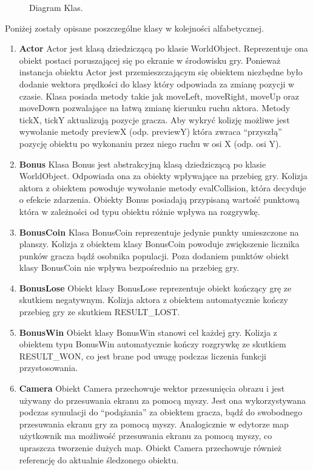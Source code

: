 \begin{par}
\begin{figure}[!h]
	\caption{Diagram Klas.}
	\label{fig:diagram_klas}
	\end{figure}
	Poniżej zostały opisane poszczególne klasy w kolejności alfabetycznej.
	\begin{enumerate}
	\item{\bf Actor }\newline
	Actor jest klasą dziedziczącą po klasie WorldObject. Reprezentuje ona obiekt postaci poruszającej się po ekranie w środowisku gry. Ponieważ instancja obiektu Actor jest przemieszczającym się obiektem niezbędne było dodanie wektora prędkości do klasy który odpowiada za zmianę pozycji w czasie. Klasa posiada metody takie jak moveLeft, moveRight, moveUp oraz moveDown pozwalające na łatwą zmianę kierunku ruchu aktora. Metody tickX, tickY aktualizują pozycje gracza. Aby wykryć kolizję możliwe jest wywołanie metody previewX (odp. previewY) która zwraca ``przyszłą'' pozycję obiektu po wykonaniu przez niego ruchu w osi X (odp. osi Y).
	\item{\bf Bonus }\newline
	Klasa Bonus jest abstrakcyjną klasą dziedziczącą po klasie WorldObject. Odpowiada ona za obiekty wpływające na przebieg gry. Kolizja aktora z obiektem powoduje wywołanie metody evalCollision, która decyduje o efekcie zdarzenia. Obiekty Bonus posiadają przypisaną wartość punktową która w zależności od typu obiektu różnie wpływa na rozgrywkę.
	\item{\bf BonusCoin }\newline
	Klasa BonusCoin reprezentuje jedynie punkty umieszczone na planszy. Kolizja z obiektem klasy BonusCoin powoduje zwiększenie licznika punków gracza bądź osobnika populacji. Poza dodaniem punktów obiekt klasy BonusCoin nie wpływa bezpośrednio na przebieg gry.
	\item{\bf BonusLose }\newline
	Obiekt klasy BonusLose reprezentuje obiekt kończący grę ze skutkiem negatywnym. Kolizja aktora z obiektem automatycznie kończy przebieg gry ze skutkiem RESULT\_LOST.
	\item{\bf BonusWin }\newline
	Obiekt klasy BonusWin stanowi cel każdej gry. Kolizja z obiektem typu BonusWin automatycznie kończy rozgrywkę ze skutkiem RESULT\_WON, co jest brane pod uwagę podczas liczenia funkcji przystosowania.
	\item{\bf Camera }\newline
	Obiekt Camera przechowuje wektor przesunięcia obrazu i jest używany do przesuwania ekranu za pomocą myszy. Jest ona wykorzystywana podczas symulacji do ``podążania'' za obiektem gracza, bądź do swobodnego przesuwania ekranu gry za pomocą myszy. Analogicznie w edytorze map użytkownik ma możliwość przesuwania ekranu za pomocą myszy, co upraszcza tworzenie dużych map. Obiekt Camera przechowuje również referencję do aktualnie śledzonego obiektu.

\end{enumerate}
\end{par}
